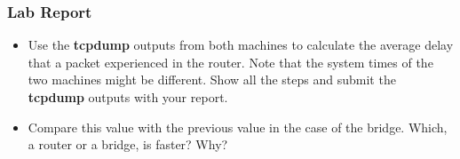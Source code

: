 \documentclass{../UTNetLab}
\begin{document}
    \subsubsection*{ Lab Report}
    \begin{itemize}
        \setlength{\itemindent}{0pt}
        \item Use the \textbf{tcpdump} outputs from both machines to calculate the average delay that a packet experienced in the router. Note that the system times of the two machines might be different. Show all the steps and submit the \textbf{tcpdump} outputs with your report.
        \item Compare this value with the previous value in the case of the bridge. Which, a router or a bridge, is faster? Why?
    \end{itemize}
\end{document}
